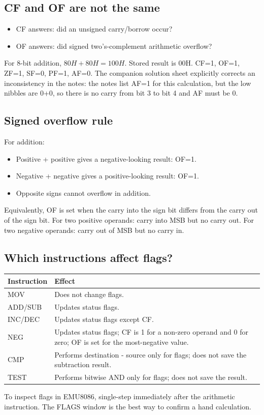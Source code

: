 \documentclass[11pt,a4paper]{article}
\begin{document}
\subsection{CF and OF are not the same}
\begin{itemize}
\item CF answers: did an unsigned carry/borrow occur?
\item OF answers: did signed two's-complement arithmetic overflow?
\end{itemize}
For 8-bit addition, $80H+80H=100H$. Stored result is 00H. CF=1, OF=1, ZF=1, SF=0, PF=1, AF=0. The companion solution sheet explicitly corrects an inconsistency in the notes: the notes list AF=1 for this calculation, but the low nibbles are 0+0, so there is no carry from bit 3 to bit 4 and AF must be 0.

\subsection{Signed overflow rule}
For addition:
\begin{itemize}
\item Positive + positive gives a negative-looking result: OF=1.
\item Negative + negative gives a positive-looking result: OF=1.
\item Opposite signs cannot overflow in addition.
\end{itemize}
Equivalently, OF is set when the carry into the sign bit differs from the carry out of the sign bit. For two positive operands: carry into MSB but no carry out. For two negative operands: carry out of MSB but no carry in.

\subsection{Which instructions affect flags?}
\begin{tabularx}{\linewidth}{lX}
\toprule \textbf{Instruction} & \textbf{Effect}\\
\midrule
MOV & Does not change flags.\\
ADD/SUB & Updates status flags.\\
INC/DEC & Updates status flags except CF.\\
NEG & Updates status flags; CF is 1 for a non-zero operand and 0 for zero; OF is set for the most-negative value.\\
CMP & Performs destination - source only for flags; does not save the subtraction result.\\
TEST & Performs bitwise AND only for flags; does not save the result.\\
\bottomrule
\end{tabularx}
To inspect flags in EMU8086, single-step immediately after the arithmetic instruction. The FLAGS window is the best way to confirm a hand calculation.
\end{document}
